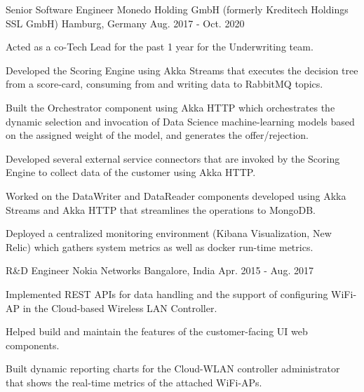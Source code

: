 

\begin{cventries}

  \cventry
    {Senior Software Engineer} %
    {Monedo Holding GmbH (formerly Kreditech Holdings SSL GmbH)} %
    {Hamburg, Germany} %
    {Aug. 2017 - Oct. 2020} %
    {
      \begin{cvitems} %
        \item {Acted as a co-Tech Lead for the past 1 year for the Underwriting team.}
        \item {Developed the Scoring Engine using Akka Streams that executes the decision tree from a score-card, consuming from and writing data to RabbitMQ topics.}
        \item {Built the Orchestrator component using Akka HTTP which orchestrates the dynamic selection and invocation of Data Science machine-learning models based on the assigned weight of the model, and generates the offer/rejection.}
        \item {Developed several external service connectors that are invoked by the Scoring Engine to collect data of the customer using Akka HTTP.}
        \item {Worked on the DataWriter and DataReader components developed using Akka Streams and Akka HTTP that streamlines the operations to MongoDB.}
        \item {Deployed a centralized monitoring environment (Kibana Visualization, New Relic) which gathers system metrics as well as docker run-time metrics.}
      \end{cvitems}
    }

  \cventry
    {R\&D Engineer} %
    {Nokia Networks} %
    {Bangalore, India} %
    {Apr. 2015 - Aug. 2017} %
    {
      \begin{cvitems} %
        \item {Implemented REST APIs for data handling and the support of configuring WiFi-AP in the Cloud-based Wireless LAN Controller.}
        \item {Helped build and maintain the features of the customer-facing UI web components.}
        \item {Built dynamic reporting charts for the Cloud-WLAN controller administrator that shows the real-time metrics of the attached WiFi-APs.}
      \end{cvitems}
    }


\end{cventries}
